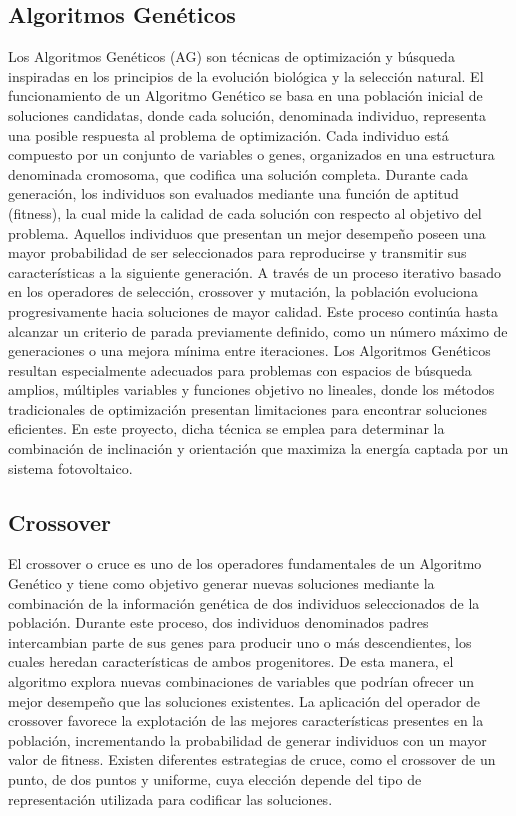 \documentclass[12pt, a4paper]{article}
\begin{document}
\subsection{Algoritmos Genéticos}
Los Algoritmos Genéticos (AG) son técnicas de optimización y búsqueda inspiradas en los principios de la evolución biológica y la selección natural.
El funcionamiento de un Algoritmo Genético se basa en una población inicial de soluciones candidatas, donde cada solución, denominada individuo, representa una posible respuesta al problema de optimización. Cada individuo está compuesto por un conjunto de variables o genes, organizados en una estructura denominada cromosoma, que codifica una solución completa.
Durante cada generación, los individuos son evaluados mediante una función de aptitud (fitness), la cual mide la calidad de cada solución con respecto al objetivo del problema. Aquellos individuos que presentan un mejor desempeño poseen una mayor probabilidad de ser seleccionados para reproducirse y transmitir sus características a la siguiente generación.
A través de un proceso iterativo basado en los operadores de selección, crossover y mutación, la población evoluciona progresivamente hacia soluciones de mayor calidad. Este proceso continúa hasta alcanzar un criterio de parada previamente definido, como un número máximo de generaciones o una mejora mínima entre iteraciones.
Los Algoritmos Genéticos resultan especialmente adecuados para problemas con espacios de búsqueda amplios, múltiples variables y funciones objetivo no lineales, donde los métodos tradicionales de optimización presentan limitaciones para encontrar soluciones eficientes. En este proyecto, dicha técnica se emplea para determinar la combinación de inclinación y orientación que maximiza la energía captada por un sistema fotovoltaico.

\subsection{Crossover}
El crossover o cruce es uno de los operadores fundamentales de un Algoritmo Genético y tiene como objetivo generar nuevas soluciones mediante la combinación de la información genética de dos individuos seleccionados de la población.
Durante este proceso, dos individuos denominados padres intercambian parte de sus genes para producir uno o más descendientes, los cuales heredan características de ambos progenitores. De esta manera, el algoritmo explora nuevas combinaciones de variables que podrían ofrecer un mejor desempeño que las soluciones existentes.
La aplicación del operador de crossover favorece la explotación de las mejores características presentes en la población, incrementando la probabilidad de generar individuos con un mayor valor de fitness. Existen diferentes estrategias de cruce, como el crossover de un punto, de dos puntos y uniforme, cuya elección depende del tipo de representación utilizada para codificar las soluciones.
\end{document}
